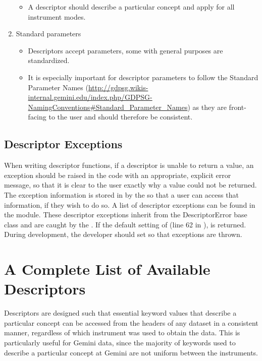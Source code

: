 \documentclass[letterpaper,10pt,english]{sphinxmanual}
\begin{document}
\begin{enumerate}
\begin{itemize}
\begin{itemize}
\end{itemize}

\item {} 
A descriptor should describe a particular concept and apply for all
instrument modes.

\end{itemize}

\item {} 
Standard parameters
\begin{itemize}
\item {} 
Descriptors accept parameters, some with general purposes are
standardized.

\item {} 
It is especially important for descriptor parameters to follow the
Standard Parameter Names
(\href{http://gdpsg.wikis-internal.gemini.edu/index.php/GDPSG-NamingConventions\#Standard\_Parameter\_Names}{http://gdpsg.wikis-internal.gemini.edu/index.php/GDPSG-NamingConventions\#Standard\_Parameter\_Names}) as they are front-facing to the user and should
therefore be consistent.

\end{itemize}

\end{enumerate}


\section{Descriptor Exceptions}
\label{coding:descriptor-exceptions}\label{coding:id2}
When writing descriptor functions, if a descriptor is unable to return a value,
an exception should be raised in the code with an appropriate, explicit error
message, so that it is clear to the user exactly why a value could not be
returned. The exception information is stored in  by the
 so that a user can access that information, if they wish to do so. A
list of descriptor exceptions can be found in the 
module. These descriptor exceptions inherit from the DescriptorError base class
and are caught by the . If the default setting of  (line 62 in ),  is returned. During
development, the developer should set  so that
exceptions are thrown.
\appendix
\noappendicestocpagenum
\addappheadtotoc

\chapter{A Complete List of Available Descriptors}
\label{appendices/appendixA:a-complete-list-of-available-descriptors}\label{appendices/appendixA::doc}\label{appendices/appendixA:appendix-typewalk}
Descriptors are designed such that essential keyword values that describe a
particular concept can be accessed from the headers of any dataset in a
consistent manner, regardless of which instrument was used to obtain the
data. This is particularly useful for Gemini data, since the majority of
keywords used to describe a particular concept at Gemini are not uniform
between the instruments.
\end{document}
